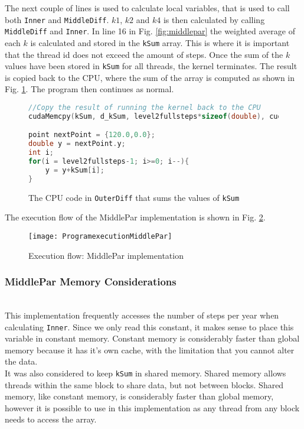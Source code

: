 The next couple of lines is used to calculate local variables, that is used to call both \texttt{Inner} and \texttt{MiddleDiff}. $k1$, $k2$ and $k4$ is then calculated by calling \texttt{MiddleDiff} and \texttt{Inner}. In line 16 in Fig. \ref{fig:middlepar} the weighted average of each $k$ is calculated and stored in the \texttt{kSum} array. This is where it is important that the thread id does not exceed the amount of steps. Once the sum of the $k$ values have been stored in \texttt{kSum} for all threads, the kernel terminates. The result is copied back to the CPU, where the sum of the array is computed as shown in Fig. \ref{fig:middleparcpu}. The program then continues as normal.

\begin{figure}[ht!]
\begin{lstlisting}[language=c]
//Copy the result of running the kernel back to the CPU
cudaMemcpy(kSum, d_kSum, level2fullsteps*sizeof(double), cudaMemcpyDeviceToHost);

point nextPoint = {120.0,0.0};
double y = nextPoint.y;
int i;
for(i = level2fullsteps-1; i>=0; i--){
	y = y+kSum[i];
}
\end{lstlisting}
\caption{The CPU code in \texttt{OuterDiff} that sums the values of \texttt{kSum}}
\label{fig:middleparcpu}
\end{figure}

The execution flow of the MiddlePar implementation is shown in Fig. \ref{fig:middleparexec}.

\begin{figure}[ht!]
  \centering
    \texttt{[image: ProgramexecutionMiddlePar]}
  \caption{Execution flow: MiddlePar implementation}
  \label{fig:middleparexec}
\end{figure}
\FloatBarrier

\subsubsection{MiddlePar Memory Considerations} \hfill \\
This implementation frequently accesses the number of steps per year when calculating \texttt{Inner}. Since we only read this constant, it makes sense to place this variable in constant memory. Constant memory is considerably faster than global memory \cite{bpg} because it has it's own cache, with the limitation that you cannot alter the data.\\

It was also considered to keep \texttt{kSum} in shared memory. Shared memory allows threads within the same block to share data, but not between blocks. Shared memory, like constant memory, is considerably faster than global memory, however it is possible to use in this implementation as any thread from any block needs to access the array.


